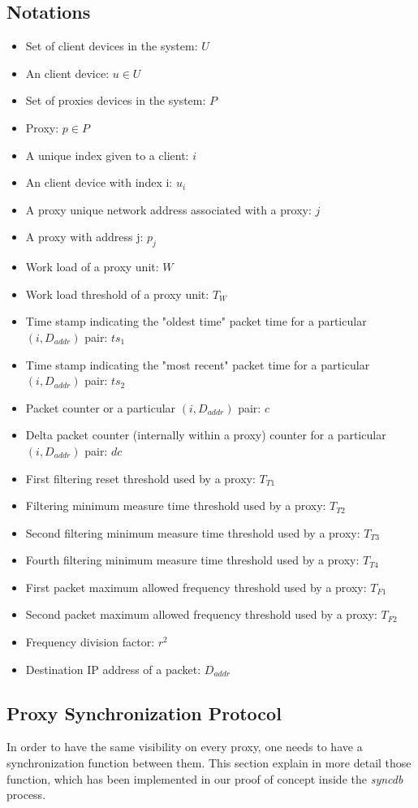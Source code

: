 \documentclass[sigplan,screen]{acmart}
\begin{document}
\subsection{Notations}
\begin{itemize}
\item Set of client devices in the system: $U$
\item An client device: $u \in U$
\item Set of proxies devices in the system: $P$
\item Proxy: $p \in P$
\item A unique index given to a client: $i$
\item An client device with index i: $u_i$
\item A proxy unique network address associated with a proxy: $j$
\item A proxy with address j: $p_j$
\item Work load of a proxy unit: $W$
\item Work load threshold of a proxy unit: $T_W$
\item Time stamp indicating the "oldest time" packet time for a particular $(i,D_{addr})$ pair: $ts_1$
\item Time stamp indicating the "most recent" packet time for a particular $(i,D_{addr})$ pair: $ts_2$
\item Packet counter or a particular $(i,D_{addr})$ pair: $c$
\item Delta packet counter (internally within a proxy) counter for a particular $(i,D_{addr})$ pair: $dc$
\item First filtering reset threshold used by a proxy: $T_{T1}$
\item Filtering minimum measure time threshold used by a proxy: $T_{T2}$
\item Second filtering minimum measure time threshold used by a proxy: $T_{T3}$
\item Fourth filtering minimum measure time threshold used by a proxy: $T_{T4}$
\item First packet maximum allowed frequency threshold used by a proxy: $T_{F1}$
\item Second packet maximum allowed frequency threshold used by a proxy: $T_{F2}$
\item Frequency division factor: $r^2$
\item Destination IP address of a packet: $D_{addr}$
\end{itemize}

\subsection{Proxy Synchronization Protocol}
\label{psp}
In order to have the same visibility on every proxy, one needs to have a synchronization function between them. This section explain in more detail those function, which has been implemented in our proof of concept inside the \textit{syncdb} process. 
\end{document}
